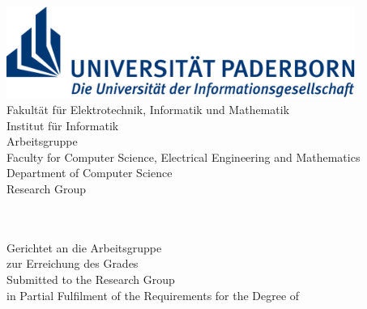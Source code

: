 \begin{titlepage}
	\begin{center}
		\begin{minipage}{135mm}
			\includegraphics[height=30mm]{figures/uni-logo}\\
			\ifgerman
				\textsf{
					\hspace*{20mm} Fakultät für Elektrotechnik,
					Informatik und Mathematik \\
					\hspace*{20mm} Institut für Informatik \\
					\hspace*{20mm} Arbeitsgruppe \theresearchgroup{} \\
				}
			\else
				\textsf{
					\hspace*{20mm} Faculty for Computer Science, 
					Electrical Engineering and Mathematics \\
					\hspace*{20mm} Department of Computer Science \\
					\hspace*{20mm} Research Group \theresearchgroup{} \\
				}
			\fi 
		\end{minipage}\\[40pt]

		{\huge \thethesistype{}}\\[5pt]
		\ifgerman
			Gerichtet an die Arbeitsgruppe \theresearchgroup{}\\
			zur Erreichung des Grades\\[5pt]
		\else
			Submitted to the \theresearchgroup{} Research Group\\
			in Partial Fulfilment of the Requirements
			for the Degree of\\[5pt]
		\fi 
		{\huge \thedegree{}}\\[30pt]

		{\Huge\textbf{\thetitle{}}}\\[30pt]


\end{center}
\end{titlepage}

